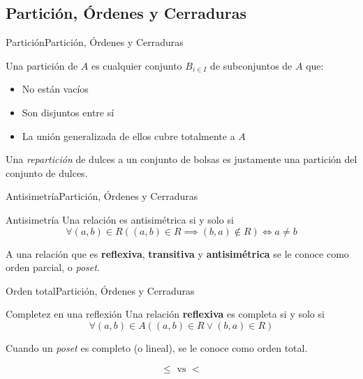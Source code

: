\documentclass[spanish, c]{beamer}
\begin{document}
\subsection{Partición, Órdenes y Cerraduras}

\begin{frame}{Partición}{Partición, Órdenes y Cerraduras}
    
    Una \alert{partición} de $A$ es cualquier conjunto $B_{i \in I}$ de subconjuntos de $A$ que:

    \begin{itemize}
        \item No están vacíos
        \item Son disjuntos entre sí
        \item La unión generalizada de ellos cubre totalmente a $A$
    \end{itemize} \pause

    \bigskip

    Una \textit{repartición} de dulces a un conjunto de bolsas es justamente una partición del conjunto de dulces.

\end{frame}

\begin{frame}{Antisimetría}{Partición, Órdenes y Cerraduras}

    \begin{block}{Antisimetría}
        Una relación es \alert{antisimétrica} si y solo si
        $$\forall (a,b) \in R\left( (a, b) \in R \implies (b, a) \not \in R \right) \iff a \neq b$$
    \end{block} \pause

    \bigskip

    A una relación que es \textbf{reflexiva}, \textbf{transitiva} y \textbf{antisimétrica} se le conoce como \alert{orden parcial}, o \textit{poset}.

\end{frame}

\begin{frame}{Orden total}{Partición, Órdenes y Cerraduras}

    \begin{block}{Completez en una reflexión}
        Una relación \textbf{reflexiva} es \alert{completa} si y solo si
        $$\forall (a, b) \in A \left((a,b) \in R \vee (b, a) \in R \right)$$
    \end{block} \pause

    Cuando un \textit{poset} es completo (o lineal), se le conoce como \alert{orden total}. \pause

    \bigskip

    \begin{center}
        \Huge $$\leq \text{ vs } < $$
    \end{center}
\end{frame}
\end{document}
